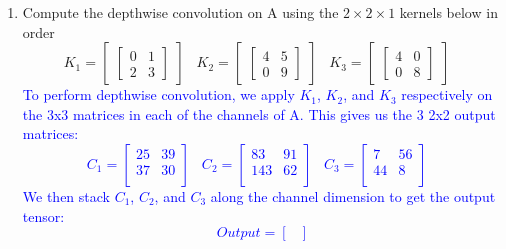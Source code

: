\documentclass{article}
\begin{document}
\begin{enumerate}[label=(\alph*)]
    \item Compute the depthwise convolution on A using the $2 \times 2 \times 1$ kernels below in order
    \[K_1 = 
        \begin{bmatrix}
        \begin{bmatrix}
            0 & 1 \\
            2 & 3
        \end{bmatrix}
        \end{bmatrix}
        \;\;\;
      K_2 = 
      \begin{bmatrix}
      \begin{bmatrix}
            4 & 5 \\
            0 & 9
        \end{bmatrix}
        \end{bmatrix}
        \;\;\;
      K_3 = 
      \begin{bmatrix}
      \begin{bmatrix}
            4 & 0 \\
            0 & 8
        \end{bmatrix}
        \end{bmatrix}
        \;\;\;  
    \]
    \textcolor{blue}{To perform depthwise convolution, we apply $K_1$, $K_2$, and $K_3$ respectively on the 3x3 matrices in each of the channels of A. This gives us the 3 2x2 output matrices: 
        \[
            C_1 = 
            \begin{bmatrix}
                25 & 39  \\
                37 & 30 \\
            \end{bmatrix}
            \;\;\;
            C_2 = 
            \begin{bmatrix}
                83 & 91  \\
                143 & 62 \\
            \end{bmatrix}
            \;\;\;
            C_3 = 
            \begin{bmatrix}
                7 & 56  \\
                44 & 8 \\
            \end{bmatrix}
            \;\;\;
        \]
      We then stack $C_1$, $C_2$, and $C_3$ along the channel dimension to get the output tensor: 
      \[Output = 
        \begin{bmatrix}

\end{bmatrix}\]}
\end{enumerate}
\end{document}
